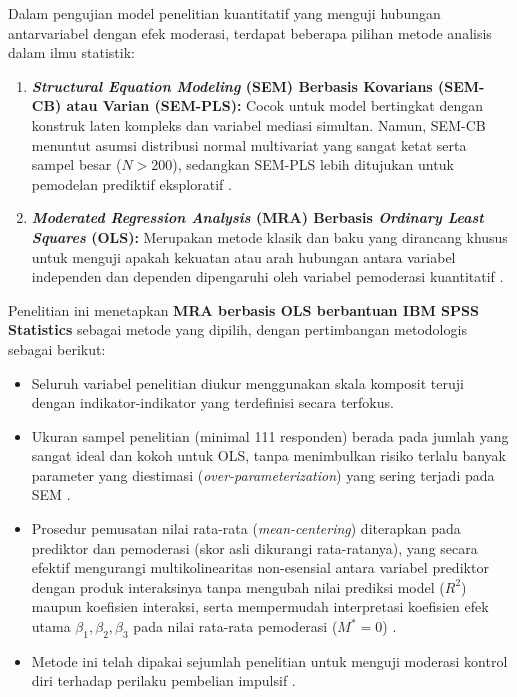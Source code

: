 \documentclass[12pt,a4paper]{article}
\numberwithin{equation}{section}
\numberwithin{table}{section}
\numberwithin{figure}{section}
\begin{document}
Dalam pengujian model penelitian kuantitatif yang menguji hubungan antarvariabel dengan efek moderasi, terdapat beberapa pilihan metode analisis dalam ilmu statistik:
\begin{enumerate}
  \item \textbf{\emph{Structural Equation Modeling} (SEM) Berbasis Kovarians (SEM-CB) atau Varian (SEM-PLS):} Cocok untuk model bertingkat dengan konstruk laten kompleks dan variabel mediasi simultan. Namun, SEM-CB menuntut asumsi distribusi normal multivariat yang sangat ketat serta sampel besar ($N > 200$), sedangkan SEM-PLS lebih ditujukan untuk pemodelan prediktif eksploratif \citep{hair2019multivariate}.
  \item \textbf{\emph{Moderated Regression Analysis} (MRA) Berbasis \emph{Ordinary Least Squares} (OLS):} Merupakan metode klasik dan baku yang dirancang khusus untuk menguji apakah kekuatan atau arah hubungan antara variabel independen dan dependen dipengaruhi oleh variabel pemoderasi kuantitatif \citep{aiken1991multiple, hayes2018introduction, ghozali2018aplikasi}.
\end{enumerate}

Penelitian ini menetapkan \textbf{MRA berbasis OLS berbantuan IBM SPSS Statistics} sebagai metode yang dipilih, dengan pertimbangan metodologis sebagai berikut:
\begin{itemize}
  \item Seluruh variabel penelitian diukur menggunakan skala komposit teruji dengan indikator-indikator yang terdefinisi secara terfokus.
  \item Ukuran sampel penelitian (minimal 111 responden) berada pada jumlah yang sangat ideal dan kokoh untuk OLS, tanpa menimbulkan risiko terlalu banyak parameter yang diestimasi (\emph{over-parameterization}) yang sering terjadi pada SEM \citep{hair2019multivariate}.
  \item Prosedur pemusatan nilai rata-rata (\emph{mean-centering}) diterapkan pada prediktor dan pemoderasi (skor asli dikurangi rata-ratanya), yang secara efektif mengurangi multikolinearitas non-esensial antara variabel prediktor dengan produk interaksinya tanpa mengubah nilai prediksi model ($R^2$) maupun koefisien interaksi, serta mempermudah interpretasi koefisien efek utama $\beta_1, \beta_2, \beta_3$ pada nilai rata-rata pemoderasi ($M^* = 0$) \citep{aiken1991multiple, hayes2018introduction}.
  \item Metode ini telah dipakai sejumlah penelitian untuk menguji moderasi kontrol diri terhadap perilaku pembelian impulsif \citep{prihatiningrum2021effect, apidana2022peran, lienardy2026role}.
\end{itemize}
\end{document}

